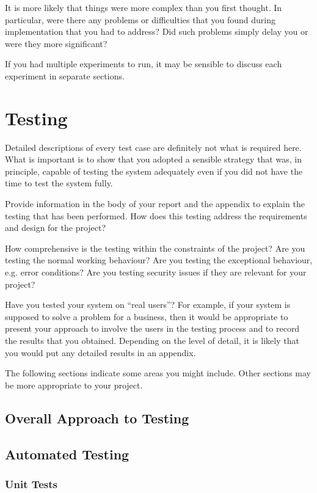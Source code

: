 It is more likely that things were more complex than you first thought. In particular, were there any problems or difficulties that you found during implementation that you had to address? Did such problems simply delay you or were they more significant? 

If you had multiple experiments to run, it may be sensible to discuss each experiment in separate sections. 

\section{Testing}
Detailed descriptions of every test case are definitely not what is required here. What is important is to show that you adopted a sensible strategy that was, in principle, capable of testing the system adequately even if you did not have the time to test the system fully.

Provide information in the body of your report and the appendix to explain the testing that has been performed. How does this testing address the requirements and design for the project?

How comprehensive is the testing within the constraints of the project?  Are you testing the normal working behaviour? Are you testing the exceptional behaviour, e.g. error conditions? Are you testing security issues if they are relevant for your project? 

Have you tested your system on ``real users''? For example, if your system is supposed to solve a problem for a business, then it would be appropriate to present your approach to involve the users in the testing process and to record the results that you obtained. Depending on the level of detail, it is likely that you would put any detailed results in an appendix.

The following sections indicate some areas you might include. Other sections may be more appropriate to your project. 

\subsection{Overall Approach to Testing}

\subsection{Automated Testing}

\subsubsection{Unit Tests}

